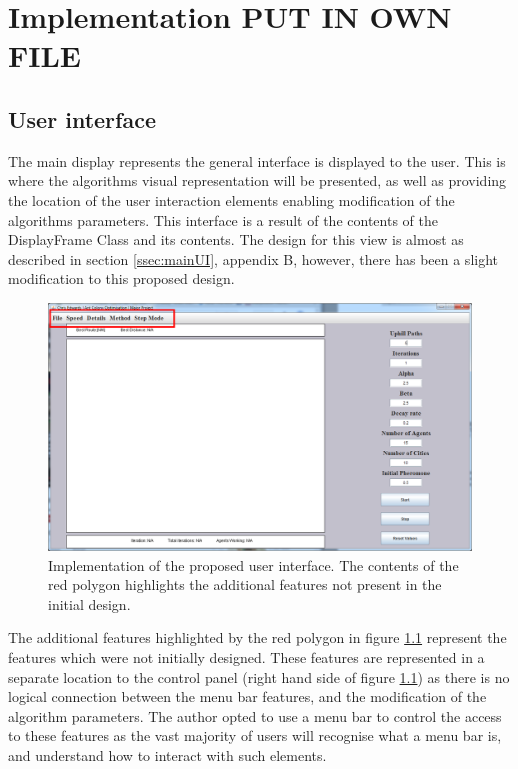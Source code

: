 \chapter{Implementation PUT IN OWN FILE}

\section{User interface}
\label{mainimp}
The main display represents the general interface is displayed to the user. This is where the algorithms visual representation will be presented, as well as providing the location of the user interaction elements enabling modification of the algorithms parameters. This interface is a result of the contents of the DisplayFrame Class and its contents. The design for this view is almost as described in section \ref{ssec:mainUI}, appendix B, however, there has been a slight modification to this proposed design.

\begin{figure}[H]
\centering
\includegraphics[scale=0.35]{Images/chapter4/displayFrame}
\caption{Implementation of the proposed user interface. The contents of the red polygon highlights the additional features not present in the initial design.}
\label{fig:displayFrameImp}
\end{figure}

The additional features highlighted by the red polygon in figure \ref{fig:displayFrameImp} represent the features which were not initially designed. These features are represented in a separate location to the control panel (right hand side of figure \ref{fig:displayFrameImp}) as there is no logical connection between the menu bar features, and the modification of the algorithm parameters. The author opted to use a menu bar to control the access to these features as the vast majority of users will recognise what a menu bar is, and understand how to interact with such elements. 

